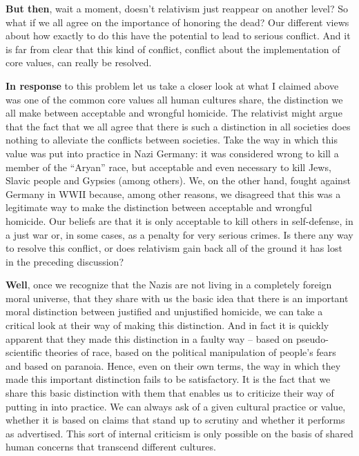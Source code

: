 \documentclass[]{book}
\begin{document}
\textbf{But then}, wait a moment, doesn't relativism just reappear on another level? So what if we all agree on the importance of honoring the dead? Our different views about how exactly to do this have the potential to lead to serious conflict. And it is far from clear that this kind of conflict, conflict about the implementation of core values, can really be resolved.

\textbf{In response} to this problem let us take a closer look at what I claimed above was one of the common core values all human cultures share, the distinction we all make between acceptable and wrongful homicide. The relativist might argue that the fact that we all agree that there is such a distinction in all societies does nothing to alleviate the conflicts between societies. Take the way in which this value was put into practice in Nazi Germany: it was considered wrong to kill a member of the ``Aryan'' race, but acceptable and even necessary to kill Jews, Slavic people and Gypsies (among others). We, on the other hand, fought against Germany in WWII because, among other reasons, we disagreed that this was a legitimate way to make the distinction between acceptable and wrongful homicide. Our beliefs are that it is only acceptable to kill others in self-defense, in a just war or, in some cases, as a penalty for very serious crimes. Is there any way to resolve this conflict, or does relativism gain back all of the ground it has lost in the preceding discussion?

\textbf{Well}, once we recognize that the Nazis are not living in a completely foreign moral universe, that they share with us the basic idea that there is an important moral distinction between justified and unjustified homicide, we can take a critical look at their way of making this distinction. And in fact it is quickly apparent that they made this distinction in a faulty way -- based on pseudo-scientific theories of race, based on the political manipulation of people's fears and based on paranoia. Hence, even on their own terms, the way in which they made this important distinction fails to be satisfactory. It is the fact that we share this basic distinction with them that enables us to criticize their way of putting in into practice. We can always ask of a given cultural practice or value, whether it is based on claims that stand up to scrutiny and whether it performs as advertised. This sort of internal criticism is only possible on the basis of shared human concerns that transcend different cultures.
\end{document}
